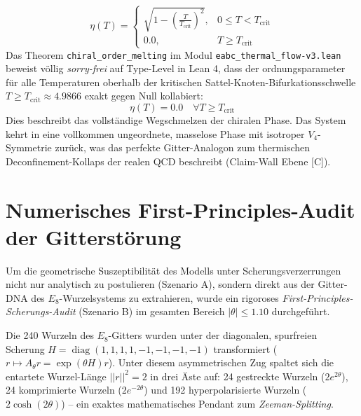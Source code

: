 \documentclass[11pt,a4paper]{article}
\begin{document}
\begin{itemize}
		\begin{equation}
			\eta(T) = \begin{cases} \sqrt{1 - \left(\frac{T}{T_{\text{crit}}}\right)^2}, & 0 \le T < T_{\text{crit}} \\ 0.0, & T \ge T_{\text{crit}} \end{cases}
		\end{equation}
		Das Theorem \texttt{chiral\_order\_melting} im Modul \texttt{eabc\_thermal\_flow-v3.lean} beweist völlig \textit{sorry-frei} auf Type-Level in Lean 4, dass der ordnungsparameter für alle Temperaturen oberhalb der kritischen Sattel-Knoten-Bifurkationsschwelle $T \ge T_{\text{crit}} \approx 4.9866$ exakt gegen Null kollabiert:
		\begin{equation}
			\eta(T) = 0.0 \quad \forall T \ge T_{\text{crit}}
		\end{equation}
		Dies beschreibt das vollständige Wegschmelzen der chiralen Phase. Das System kehrt in eine vollkommen ungeordnete, masselose Phase mit isotroper $V_4$-Symmetrie zurück, was das perfekte Gitter-Analogon zum thermischen Deconfinement-Kollaps der realen QCD beschreibt (Claim-Wall Ebene [C]).
	\end{itemize}
	
	\section{Numerisches First-Principles-Audit der Gitterstörung}
	Um die geometrische Suszeptibilität des Modells unter Scherungsverzerrungen nicht nur analytisch zu postulieren (Szenario A), sondern direkt aus der Gitter-DNA des $E_8$-Wurzelsystems zu extrahieren, wurde ein rigoroses \textit{First-Principles-Scherungs-Audit} (Szenario B) im gesamten Bereich $|\theta| \le 1.10$ durchgeführt.
	
	Die 240 Wurzeln des $E_8$-Gitters wurden unter der diagonalen, spurfreien Scherung $H = \operatorname{diag}(1, 1, 1, 1, -1, -1, -1, -1)$ transformiert ($r \mapsto A_\theta r = \exp(\theta H) r$). Unter diesem asymmetrischen Zug spaltet sich die entartete Wurzel-Länge $||r||^2 = 2$ in drei Äste auf: 24 gestreckte Wurzeln ($2e^{2\theta}$), 24 komprimierte Wurzeln ($2e^{-2\theta}$) und 192 hyperpolarisierte Wurzeln ($2\cosh(2\theta)$) -- ein exaktes mathematisches Pendant zum \textit{Zeeman-Splitting}.
	
\end{document}
